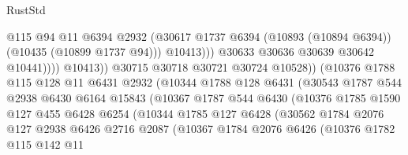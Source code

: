 \begin{lexlean}{RustStd}
\begin{coremodule}
                                        @115
                                        @94
                                        @11
                                        @6394
                                        @2932
                                        (@30617
                                          @1737
                                          @6394
                                          (@10893 (@10894 @6394))
                                          (@10435 (@10899 @1737 @94)))
                                        @10413)))
                                  @30633
                                  @30636
                                  @30639
                                  @30642
                                  @10441))))
                          @10413))
                      @30715
                      @30718
                      @30721
                      @30724
                      @10528))
                  (@10376
                    @1788
                    @115
                    @128
                    @11
                    @6431
                    @2932
                    (@10344
                      @1788
                      @128
                      @6431
                      (@30543
                        @1787
                        @544
                        @2938
                        @6430
                        @6164
                        @15843
                        (@10367
                          @1787
                          @544
                          @6430
                          (@10376
                            @1785
                            @1590
                            @127
                            @455
                            @6428
                            @6254
                            (@10344
                              @1785
                              @127
                              @6428
                              (@30562
                                @1784
                                @2076
                                @127
                                @2938
                                @6426
                                @2716
                                @2087
                                (@10367
                                  @1784
                                  @2076
                                  @6426
                                  (@10376
                                    @1782
                                    @115
                                    @142
                                    @11

\end{coremodule}
\end{lexlean}

